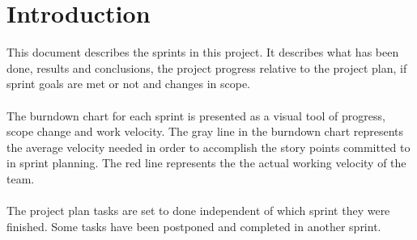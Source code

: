 \chapter*{Introduction}

This document describes the sprints in this project. It describes what has been done, results and conclusions, the project progress relative to the project plan, if sprint goals are met or not and changes in scope.
\\\\
The burndown chart for each sprint is presented as a visual tool of progress, scope change and work velocity. The gray line in the burndown chart represents the average velocity needed in order to accomplish the story points committed to in sprint planning. The red line represents the the actual working velocity of the team.
\\\\
The project plan tasks are set to done independent of which sprint they were finished. Some tasks have been postponed and completed in another sprint.
